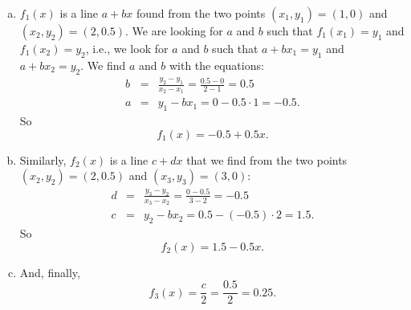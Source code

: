 \documentclass[12pt,thmsa]{article}
\begin{document}
\begin{enumerate}
  \begin{enumerate}[(a)]
  \item $f_1(x)$ is a line $a + bx$ found from the two points $(x_1, y_1) = (1,0)$ and $(x_2, y_2) =
    (2,0.5)$. We are looking for $a$ and $b$ such that  $f_{1}(x_{1}) = y_{1}$ and $f_{1}(x_{2}) = y_{2}$, i.e., we look for $a$ and $b$ such that $a+bx_{1}=y_{1}$ and $a+bx_{2}=y_{2}$. We find $a$ and $b$ with the equations: 
    \begin{eqnarray*}
      b &=& \frac{y_2 - y_1}{x_2 - x_1} = \frac{0.5-0}{2-1} = 0.5 \\
      a &=& y_1 - b x_1 = 0 - 0.5 \cdot 1 = -0.5.
    \end{eqnarray*}
    So
    \begin{equation*}
      f_1(x) = -0.5 + 0.5x.
    \end{equation*}
  \item Similarly, $f_2(x)$ is a line $c + dx$ that we find from the two points $(x_2, y_2) = (2,0.5)$ and $(x_3,y_3) = (3,0)$: 
    \begin{eqnarray*}
      d &=& \frac{y_3 - y_2}{x_3 - x_2} = \frac{0-0.5}{3-2} = -0.5 \\
      c &=& y_2 - b x_2 = 0.5 - (-0.5) \cdot 2 = 1.5.
    \end{eqnarray*}
    So 
    \begin{equation*}
      f_2(x) = 1.5-0.5x.
    \end{equation*}
  \item And, finally, 
    \begin{equation*}
      f_3(x) = \frac{c}{2} = \frac{0.5}{2} = 0.25.
    \end{equation*}
  \end{enumerate}
  
  

\end{enumerate}
\end{document}
